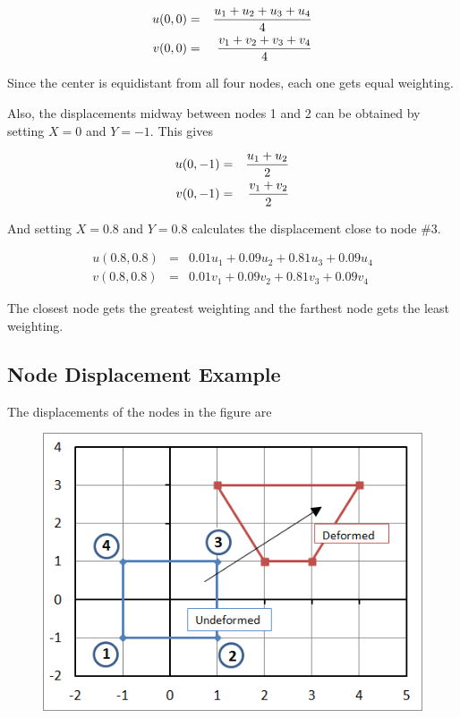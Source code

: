 \begin{eqnarray*}
u(0,0) & = & { u_1 + u_2 + u_3 + u_4 \over 4 }
\\
v(0,0) & = & { v_1 + v_2 + v_3 + v_4 \over 4 }
\end{eqnarray*}

Since the center is equidistant from all four nodes, each one gets equal weighting.

Also, the displacements midway between nodes 1 and 2 can be obtained
by setting $ X=0 $ and $ Y = -1 $.  This gives

\begin{eqnarray*}
u(0,-1) & = & { u_1 + u_2 \over 2 }
\\
v(0,-1) & = & { v_1 + v_2 \over 2 }
\end{eqnarray*}

And setting $ X = 0.8 $ and $ Y = 0.8 $ calculates the displacement close to node \#3.

\begin{eqnarray*}
u(0.8,0.8) & = & 0.01 u_1 + 0.09 u_2 + 0.81 u_3 + 0.09 u_4\\
v(0.8,0.8) & = & 0.01 v_1 + 0.09 v_2 + 0.81 v_3 + 0.09 v_4
\end{eqnarray*}

The closest node gets the greatest weighting and the farthest node gets the least weighting.

\subsection{Node Displacement Example}
The displacements of the nodes in the figure are

\begin{figure}[h]
\centering
\includegraphics[width=0.7\linewidth]{figure/simple_fe_mapping_example}
\caption{}
\label{fig:simple_fe_mapping_example}
\end{figure}

